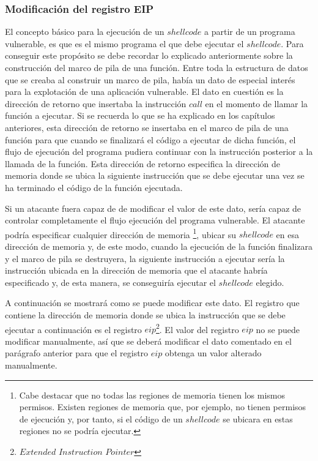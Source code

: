 \documentclass [titlepage, 12pt]{article}
\begin{document}
\subsubsection{Modificaci\'on del registro EIP}

El concepto b\'asico para la ejecuci\'on de un $shellcode$ a partir de un programa vulnerable, es que es el mismo programa el que debe ejecutar el $shellcode$. Para conseguir este prop\'osito se debe recordar lo explicado anteriormente sobre la construcci\'on del marco de pila de una funci\'on. Entre toda la estructura de datos que se creaba al construir un marco de pila, hab\'ia un dato de especial inter\'es para la explotaci\'on de una aplicaci\'on vulnerable. El dato en cuesti\'on es la direcci\'on de retorno que insertaba la instrucci\'on $call$ en el momento de llamar la funci\'on a ejecutar. Si se recuerda lo que se ha explicado en los cap\'itulos anteriores, esta direcci\'on de retorno se insertaba en el marco de pila de una funci\'on para que cuando se finalizar\'a el c\'odigo a ejecutar de dicha funci\'on, el flujo de ejecuci\'on del programa pudiera continuar con la instrucci\'on posterior a la llamada de la funci\'on. Esta direcci\'on de retorno especifica la direcci\'on de memoria donde se ubica la siguiente instrucci\'on que se debe ejecutar una vez se ha terminado el c\'odigo de la funci\'on ejecutada. \bigskip

Si un atacante fuera capaz de de modificar el valor de este dato, ser\'ia capaz de controlar completamente el flujo ejecuci\'on del programa vulnerable. El atacante podr\'ia especificar cualquier direcci\'on de memoria \footnote{Cabe destacar que no todas las regiones de memoria tienen los mismos permisos. Existen regiones de memoria que, por ejemplo, no tienen permisos de ejecuci\'on y, por tanto, si el c\'odigo de un $shellcode$ se ubicara en estas regiones no se podr\'ia ejecutar.}, ubicar su $shellcode$ en esa direcci\'on de memoria y, de este modo, cuando la ejecuci\'on de la funci\'on finalizara y el marco de pila se destruyera, la siguiente instrucci\'on a ejecutar ser\'ia la instrucci\'on ubicada en la direcci\'on de memoria que el atacante habr\'ia especificado y, de esta manera, se conseguir\'ia ejecutar el $shellcode$ elegido.\bigskip

A continuaci\'on se mostrar\'a como se puede modificar este dato. El registro que contiene la direcci\'on de memoria donde se ubica la instrucci\'on que se debe ejecutar a continuaci\'on es el registro $eip$\footnote{$Extended$ $Instruction$ $Pointer$}. El valor del registro $eip$ no se puede modificar manualmente, as\'i que se deber\'a modificar el dato comentado en el par\'agrafo anterior para que el registro $eip$ obtenga un valor alterado manualmente. \bigskip
\end{document}
